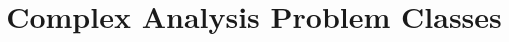 \documentclass[a4paper, answers]{exam}
\title{Complex Analysis Problem Classes}
\author{}
\begin{document}
    \maketitle
    \begin{questions}
        
    \end{questions}
\end{document}
